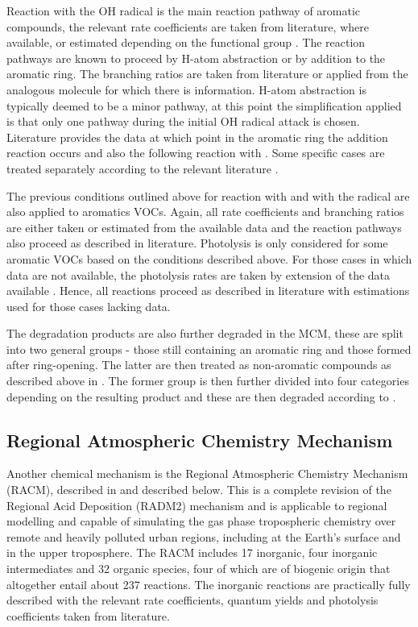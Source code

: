 Reaction with the OH radical is the main reaction pathway of aromatic compounds, the relevant rate coefficients are taken from literature, where available, or estimated depending on the functional group \citep{Jenkin:2003}. 
The reaction pathways are known to proceed by H-atom abstraction or by addition to the aromatic ring. 
The branching ratios are taken from literature or applied from the analogous molecule for which there is information. 
H-atom abstraction is typically deemed to be a minor pathway, at this point the simplification applied is that only one pathway during the initial OH radical attack is chosen. 
Literature provides the data at which point in the aromatic ring the addition reaction occurs and also the following reaction with . 
Some specific cases are treated separately according to the relevant literature \citep{Jenkin:2003}.

The previous conditions outlined above for reaction with  and with the  radical are also applied to aromatics VOCs. 
Again, all rate coefficients and branching ratios are either taken or estimated from the available data and the reaction pathways also proceed as described in literature. 
Photolysis is only considered for some aromatic VOCs based on the conditions described above. 
For those cases in which data are not available, the photolysis rates are taken by extension of the data available \citep{Jenkin:2003}. 
Hence, all reactions proceed as described in literature with estimations used for those cases lacking data.

The degradation products are also further degraded in the MCM, these are split into two general groups - those still containing an aromatic ring and those formed after ring-opening. 
The latter are then treated as non-aromatic compounds as described above in \citep{Saunders:2003}. 
The former group is then further divided into four categories depending on the resulting product and these are then degraded according to \citep{Jenkin:2003}.

\subsection{Regional Atmospheric Chemistry Mechanism}
Another chemical mechanism is the Regional Atmospheric Chemistry Mechanism (RACM), described in \citep{Stockwell:1997} and described below. 
This is a complete revision of the Regional Acid Deposition (RADM2) mechanism and is applicable to regional modelling and capable of simulating the gas phase tropospheric chemistry over remote and heavily polluted urban regions, including at the Earth's surface and in the upper troposphere. 
The RACM includes 17 inorganic, four inorganic intermediates and 32 organic species, four of which are of biogenic origin that altogether entail about 237 reactions. 
The inorganic reactions are practically fully described with the relevant rate coefficients, quantum yields and photolysis coefficients taken from literature.

